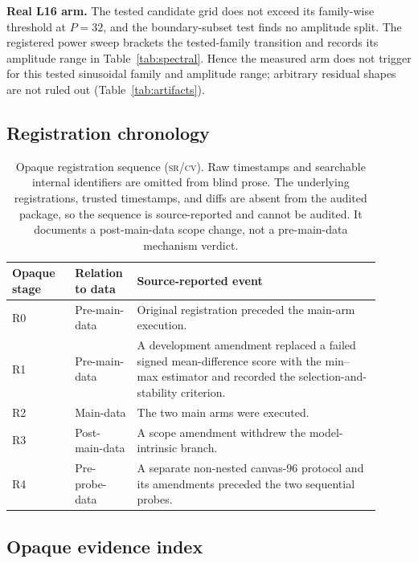 \documentclass{article}
\newcommand{\srcv}{\textsc{sr/cv}}
\begin{document}
\textbf{Real L16 arm.} The tested candidate grid does not exceed its family-wise
threshold at $P=32$, and the boundary-subset test finds no amplitude split. The
registered power sweep brackets the tested-family transition and records its
amplitude range in Table~\ref{tab:spectral}. Hence the measured arm does not
trigger for this tested sinusoidal family and amplitude range; arbitrary residual
shapes are not ruled out (Table~\ref{tab:artifacts}).

\subsection{Registration chronology}

\begin{table}[H]
\centering
\footnotesize
\setlength{\tabcolsep}{3pt}
\begin{tabular}{@{}>{\raggedright\arraybackslash}p{0.16\linewidth}
                    >{\raggedright\arraybackslash}p{0.13\linewidth}
                    >{\raggedright\arraybackslash}p{0.62\linewidth}@{}}
\toprule
Opaque stage & Relation to data & Source-reported event \\
\midrule
R0 & Pre-main-data & Original registration preceded the main-arm execution. \\
R1 & Pre-main-data & A development amendment replaced a failed signed
mean-difference score with the min--max estimator and recorded the
selection-and-stability criterion. \\
R2 & Main-data & The two main arms were executed. \\
R3 & Post-main-data & A scope amendment withdrew the model-intrinsic branch. \\
R4 & Pre-probe-data & A separate non-nested canvas-$96$ protocol and its
amendments preceded the two sequential probes. \\
\bottomrule
\end{tabular}
\caption{Opaque registration sequence (\srcv). Raw timestamps and searchable
internal identifiers are omitted from blind prose. The underlying registrations,
trusted timestamps, and diffs are absent from the audited package, so the
sequence is source-reported and cannot be audited. It documents a post-main-data
scope change, not a pre-main-data mechanism verdict.}
\label{tab:timeline}
\end{table}

\subsection{Opaque evidence index}
\end{document}

